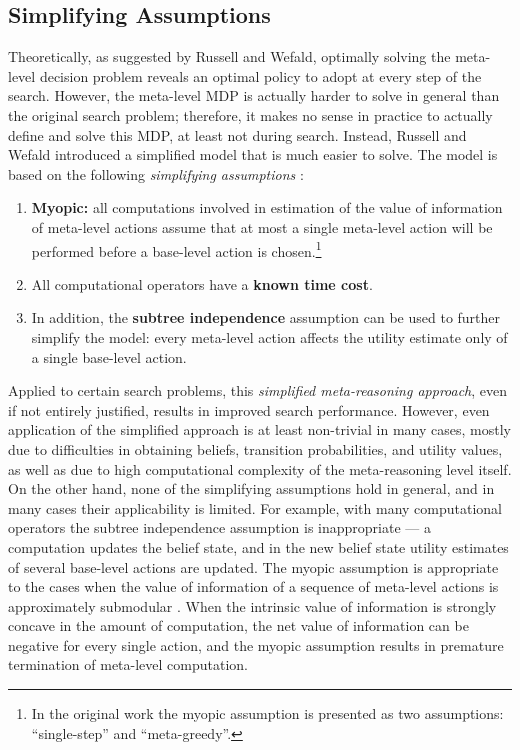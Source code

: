 \subsection{Simplifying Assumptions}
\label{sec:ratimeta-assumptions}

Theoretically, as suggested by Russell and Wefald, optimally solving
the meta-level decision problem reveals an optimal policy to adopt at
every step of the search. However, the meta-level MDP is actually
harder to solve in general than the original search problem;
therefore, it makes no sense in practice to actually define and solve 
this MDP, at least not during search. Instead, Russell and Wefald
introduced a simplified model that is much easier to solve. The model
is based on the following \emph{simplifying
assumptions} \cite{Russell.right}: 
\begin{enumerate}
\item \textbf{Myopic:} all computations involved in estimation of the
value of information of meta-level actions assume that at most a single
meta-level action will be performed before a base-level action is
chosen.\footnote{In the original work \cite{Russell.right} the myopic
assumption is presented as two assumptions: ``single-step'' and
``meta-greedy''.}
\item All computational operators have a \textbf{known time cost}.
\item In addition, the \textbf{subtree independence} assumption can
be used to further simplify the model: every meta-level action
affects the utility estimate only of a single base-level action. 
\end{enumerate}
Applied to certain search problems, this \emph{simplified
meta-reasoning approach}, even if not entirely justified, results in
improved search performance. However, even application of the
simplified approach is at least non-trivial in many cases, mostly due
to difficulties in obtaining beliefs, transition probabilities, and
utility values, as well as due to high computational complexity of the
meta-reasoning level itself. On the other hand, none of the simplifying
assumptions hold in general, and in many cases their applicability is
limited. For example, with many computational operators the subtree
independence assumption is inappropriate --- a computation updates
the belief state, and in the new belief state utility estimates of several
base-level actions are updated. The myopic assumption is appropriate to
the cases when the value of information of a sequence of meta-level
actions is approximately submodular \cite{Guestrin.submodular}. When 
the intrinsic value of information is strongly concave in the amount of
computation, the net value of information can be negative for every
single action, and the myopic assumption results in premature
termination of meta-level computation. 
